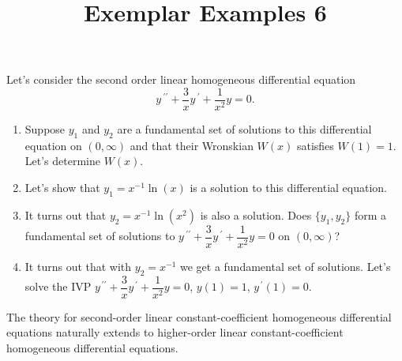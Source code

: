 \documentclass{ximera}
\begin{document}
\begin{abstract}
 \end{abstract}

    \title{Exemplar Examples 6}
    
    \maketitle

Let's consider the second order linear homogeneous differential equation $$\displaystyle y\,^{\prime\prime}+\dfrac{3}{x}y\,^{\prime}+\dfrac{1}{x^2}y=0.$$

\begin{enumerate}

\item Suppose $y_1$ and $y_2$ are a fundamental set of solutions to this differential equation on $(0,\infty)$ and that their Wronskian $W(x)$ satisfies $W(1)=1$.  Let's determine $W(x)$.

\vfill



\item Let's show that $y_1=x^{-1}\ln{(x)}$ is a solution to this differential equation.


\vfill

\item It turns out that $y_2=x^{-1}\ln{(x^2)}$ is also a solution.  Does $\{y_1,y_2\}$ form a fundamental set of solutions to $\displaystyle y\,^{\prime\prime}+\dfrac{3}{x}y\,^{\prime}+\dfrac{1}{x^2}y=0$ on $(0,\infty)$?

\vfill


\newpage

\item It turns out that with $y_2=x^{-1}$ we get a fundamental set of solutions. Let's solve the IVP $\displaystyle y^{\,\prime\prime}+\dfrac{3}{x}y^{\,\prime}+\dfrac{1}{x^2}y=0$, $y(1)=1$, $y^{\,\prime}(1)=0$.



\end{enumerate}


\newpage

The theory for second-order linear constant-coefficient homogeneous differential equations naturally extends to higher-order linear constant-coefficient homogeneous differential equations.
\end{document}
